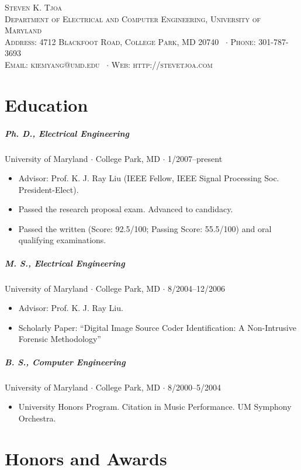 \documentclass[10pt,letterpaper]{article}
\newcommand{\namestyle}{\Huge \scshape}
\newcommand{\deptstyle}{\footnotesize \rmfamily \scshape}
\newcommand{\addressstyle}{\color{addresscolor} \footnotesize \rmfamily \upshape}
\begin{document}
\begin{center}
\namestyle Steven K. Tjoa \\[0.3em]
\deptstyle Department of Electrical and Computer Engineering, University of Maryland \\[0.2em]
\addressstyle Address: 4712 Blackfoot Road, College Park, MD 20740 \ $\cdot$ Phone: 301-787-3693\\
Email: kiemyang@umd.edu \ $\cdot$ Web: http://stevetjoa.com
\end{center}

\small

\section*{Education}

\subparagraph{Ph. D., Electrical Engineering}
University of Maryland $\cdot$ College Park, MD $\cdot$ 1/2007--present
\begin{itemize}
	\item Advisor: Prof. K. J. Ray Liu (IEEE Fellow, IEEE Signal Processing Soc. President-Elect).
	\item Passed the research proposal exam. Advanced to candidacy.
	\item Passed the written (Score: 92.5/100; Passing Score: 55.5/100) and oral qualifying examinations.
\end{itemize}

\subparagraph{M. S., Electrical Engineering}
University of Maryland $\cdot$ College Park, MD $\cdot$ 8/2004--12/2006
\begin{itemize}
	\item Advisor: Prof. K. J. Ray Liu.
	\item Scholarly Paper: ``Digital Image Source Coder Identification: A Non-Intrusive Forensic Methodology''
\end{itemize}

\subparagraph{B. S., Computer Engineering}
University of Maryland $\cdot$ College Park, MD $\cdot$ 8/2000--5/2004
\begin{itemize}
	\item University Honors Program.  Citation in Music Performance.  UM Symphony Orchestra.
\end{itemize}


\section*{Honors and Awards}
\end{document}
